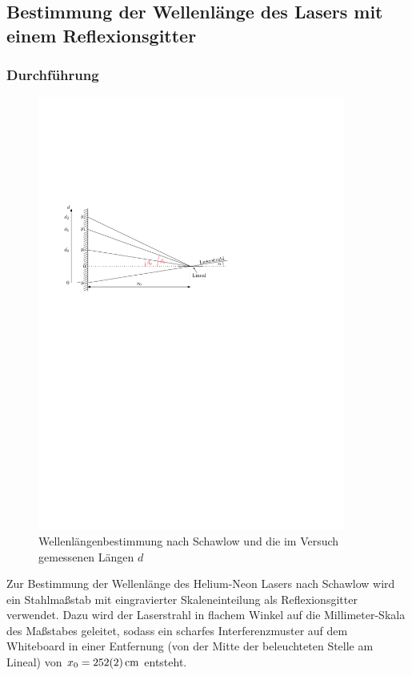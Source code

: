 \documentclass[11pt, a4paper]{article}
\numberwithin{equation}{section}
\begin{document}
\subsection{Bestimmung der Wellenlänge des Lasers mit einem Reflexionsgitter}
\subsubsection{Durchführung}
\begin{figure}[h]
	\centering
	\includegraphics[width=0.9\textwidth]{./figures/wellenlaenge_lineal.pdf}
	\caption{Wellenlängenbestimmung nach Schawlow \cite{schawlow} und die im Versuch gemessenen Längen $d$}
	\label{fig:schawlow}
\end{figure}
Zur Bestimmung der Wellenlänge des Helium-Neon Lasers nach Schawlow \cite{schawlow} wird ein Stahlmaßstab mit eingravierter Skaleneinteilung als Reflexionsgitter verwendet.
Dazu wird der Laserstrahl in flachem Winkel auf die Millimeter-Skala des Maßstabes geleitet, sodass ein scharfes Interferenzmuster auf dem Whiteboard in einer Entfernung (von der Mitte der beleuchteten Stelle am Lineal) von $x_0 = \SI{252 +- 2}{\centi\metre}$ entsteht.
\end{document}
